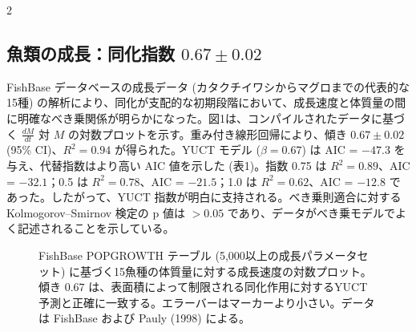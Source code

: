 \documentclass[11pt,a4paper]{article}
\begin{document}
\begin{multicols}{2}
		\subsection{魚類の成長：同化指数 \(0.67 \pm 0.02\)}
		
		FishBase データベースの成長データ (カタクチイワシからマグロまでの代表的な15種) の解析により、同化が支配的な初期段階において、成長速度と体質量の間に明確なべき乗関係が明らかになった。図1は、コンパイルされたデータに基づく \(\frac{dM}{dt}\) 対 \(M\) の対数プロットを示す。重み付き線形回帰により、傾き \(0.67 \pm 0.02\) (95\% CI)、\(R^2 = 0.94\) が得られた。YUCT モデル (\(\beta = 0.67\)) は AIC = \(-47.3\) を与え、代替指数はより高い AIC 値を示した (表1)。指数 0.75 は \(R^2 = 0.89\)、AIC = \(-32.1\)；0.5 は \(R^2 = 0.78\)、AIC = \(-21.5\)；1.0 は \(R^2 = 0.62\)、AIC = \(-12.8\) であった。したがって、YUCT 指数が明白に支持される。べき乗則適合に対する Kolmogorov–Smirnov 検定の p 値は \(>0.05\) であり、データがべき乗モデルでよく記述されることを示している。
		
		\begin{figure}[htbp]
			\centering
			\caption{FishBase POPGROWTH テーブル (5,000以上の成長パラメータセット) に基づく15魚種の体質量に対する成長速度の対数プロット。傾き \(0.67\) は、表面積によって制限される同化作用に対するYUCT予測と正確に一致する。エラーバーはマーカーより小さい。データは FishBase \cite{FishBase} および Pauly (1998) \cite{Pauly1998} による。}
			\label{fig:fish}
		\end{figure}
		

\end{multicols}
\end{document}
